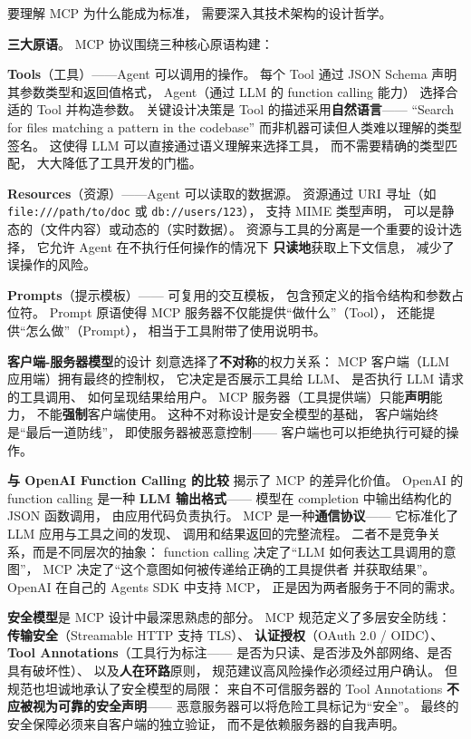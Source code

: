 要理解 MCP 为什么能成为标准，
需要深入其技术架构的设计哲学。

\textbf{三大原语}。
MCP 协议围绕三种核心原语构建：

\textbf{Tools}（工具）——Agent 可以调用的操作。
每个 Tool 通过 JSON Schema 声明其参数类型和返回值格式，
Agent（通过 LLM 的 function calling 能力）
选择合适的 Tool 并构造参数。
关键设计决策是 Tool 的描述采用\textbf{自然语言}——
“Search for files matching a pattern in the codebase”
而非机器可读但人类难以理解的类型签名。
这使得 LLM 可以直接通过语义理解来选择工具，
而不需要精确的类型匹配，
大大降低了工具开发的门槛。

\textbf{Resources}（资源）——Agent 可以读取的数据源。
资源通过 URI 寻址（如 \texttt{file:///path/to/doc}
或 \texttt{db://users/123}），
支持 MIME 类型声明，
可以是静态的（文件内容）或动态的（实时数据）。
资源与工具的分离是一个重要的设计选择，
它允许 Agent 在不执行任何操作的情况下
\textbf{只读地}获取上下文信息，
减少了误操作的风险。

\textbf{Prompts}（提示模板）——
可复用的交互模板，
包含预定义的指令结构和参数占位符。
Prompt 原语使得 MCP 服务器不仅能提供“做什么”（Tool），
还能提供“怎么做”（Prompt），
相当于工具附带了使用说明书。

\textbf{客户端-服务器模型}的设计
刻意选择了\textbf{不对称}的权力关系：
MCP 客户端（LLM 应用端）拥有最终的控制权，
它决定是否展示工具给 LLM、
是否执行 LLM 请求的工具调用、
如何呈现结果给用户。
MCP 服务器（工具提供端）只能\textbf{声明}能力，
不能\textbf{强制}客户端使用。
这种不对称设计是安全模型的基础，
客户端始终是“最后一道防线”，
即使服务器被恶意控制——
客户端也可以拒绝执行可疑的操作。

\textbf{与 OpenAI Function Calling 的比较}
揭示了 MCP 的差异化价值。
OpenAI 的 function calling 是一种
\textbf{LLM 输出格式}——
模型在 completion 中输出结构化的 JSON 函数调用，
由应用代码负责执行。
MCP 是一种\textbf{通信协议}——
它标准化了 LLM 应用与工具之间的发现、
调用和结果返回的完整流程。
二者不是竞争关系，而是不同层次的抽象：
function calling 决定了“LLM 如何表达工具调用的意图”，
MCP 决定了“这个意图如何被传递给正确的工具提供者
并获取结果”。
OpenAI 在自己的 Agents SDK 中支持 MCP，
正是因为两者服务于不同的需求。

\textbf{安全模型}是 MCP 设计中最深思熟虑的部分。
MCP 规范定义了多层安全防线：
\textbf{传输安全}（Streamable HTTP 支持 TLS）、
\textbf{认证授权}（OAuth 2.0 / OIDC）、
\textbf{Tool Annotations}（工具行为标注——
是否为只读、是否涉及外部网络、是否具有破坏性）、
以及\textbf{人在环路}原则，
规范建议高风险操作必须经过用户确认。
但规范也坦诚地承认了安全模型的局限：
来自不可信服务器的 Tool Annotations
\textbf{不应被视为可靠的安全声明}——
恶意服务器可以将危险工具标记为“安全”。
最终的安全保障必须来自客户端的独立验证，
而不是依赖服务器的自我声明。

